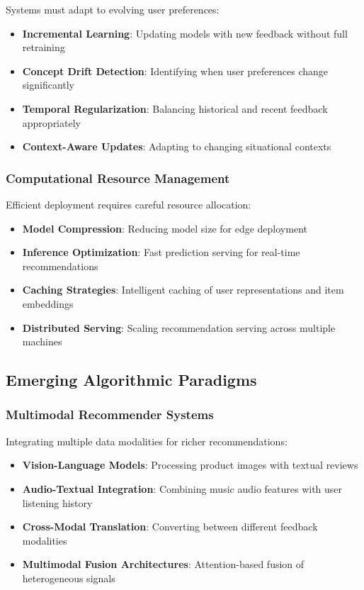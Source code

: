 Systems must adapt to evolving user preferences:

\begin{itemize}
    \item \textbf{Incremental Learning}: Updating models with new feedback without full retraining
    \item \textbf{Concept Drift Detection}: Identifying when user preferences change significantly
    \item \textbf{Temporal Regularization}: Balancing historical and recent feedback appropriately
    \item \textbf{Context-Aware Updates}: Adapting to changing situational contexts
\end{itemize}

\subsubsection{Computational Resource Management}

Efficient deployment requires careful resource allocation:

\begin{itemize}
    \item \textbf{Model Compression}: Reducing model size for edge deployment
    \item \textbf{Inference Optimization}: Fast prediction serving for real-time recommendations
    \item \textbf{Caching Strategies}: Intelligent caching of user representations and item embeddings
    \item \textbf{Distributed Serving}: Scaling recommendation serving across multiple machines
\end{itemize}

\subsection{Emerging Algorithmic Paradigms}

\subsubsection{Multimodal Recommender Systems}

Integrating multiple data modalities for richer recommendations:

\begin{itemize}
    \item \textbf{Vision-Language Models}: Processing product images with textual reviews
    \item \textbf{Audio-Textual Integration}: Combining music audio features with user listening history
    \item \textbf{Cross-Modal Translation}: Converting between different feedback modalities
    \item \textbf{Multimodal Fusion Architectures}: Attention-based fusion of heterogeneous signals
\end{itemize}

